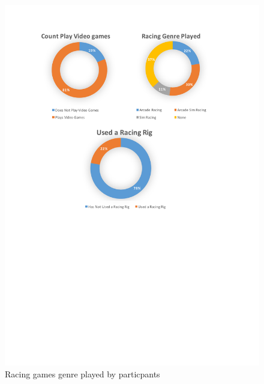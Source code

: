 \begin{figure}
\begin{minipage}{0.45\textwidth}
		\includegraphics[width=\textwidth]{charts/gamesGenrePlayed.pdf}
		\caption[Racing games genre played by particpants]{Racing games genre played by particpants}
		\label{fig:chart-gamesGenrePlayed}
	\end{minipage}
\end{figure}

